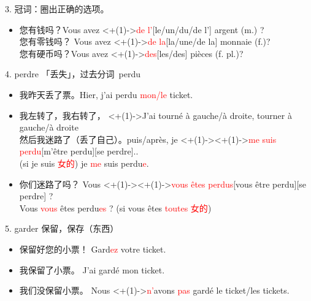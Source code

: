 \documentclass[french, aspectratio=169, 14pt, handout]{beamer}
\newcommand{\red}[1]{\textcolor{red}{#1}} %
\begin{document}
\begin{CJK*}{UTF8}{gkai}
\begin{frame}{3. 冠词：圈出正确的选项。}
\begin{itemize}
	\item 您有钱吗？Vous avez \alt<+(1)->{\red{de l'}}{[le/un/du/de l’]} argent (m.) ? \pause \\
	您有零钱吗？ Vous avez \alt<+(1)->{\red{de la}}{[la/une/de la]} monnaie (f.)? \pause \\
	您有硬币吗？Vous avez \alt<+(1)->{\red{des}}{[les/des]} pièces (f. pl.)?
\end{itemize}
\end{frame}

\begin{frame}{4. perdre 「丢失」，过去分词~perdu}
\begin{itemize}
	\item 我昨天丢了票。Hier, \pause j'ai perdu \pause \red{mon/le} ticket.  \pause
	\item 我左转了，我右转了， \pause \alt<+(1)->{J'ai tourné à gauche/à droite, }{tourner à gauche/à droite} \pause \\
	然后我迷路了（丢了自己）。puis/après, je \alt<+(1)->{\alt<+(1)->{\red{me suis perdu}}{[m'être perdu]}}{[se perdre].}.	\pause \\
	\hspace{155px} (si je suis \red{女的}) je \red{me} suis perdu\red{e}. \pause
	\item 你们迷路了吗？ Vous \alt<+(1)->{\alt<+(1)->{\red{vous êtes perdus}}{[vous être perdu]}}{[se perdre]} ? \pause \\
	\hspace{60px} Vous \red{vous} êtes perdu\red{es} ? (si vous êtes \red{toutes 女的})
\end{itemize}
\end{frame}

\begin{frame}{5. garder 保留，保存（东西）}
\begin{itemize}
	\item 保留好您的小票！ Gard\red{ez} votre ticket.  \pause
	\item 我保留了小票。 J'ai gardé mon ticket.  \pause
	\item 我们没保留小票。 Nous \only<+(1)->{\red{n'}}avons \red{pas} gardé le ticket/les tickets. 
\end{itemize}
\end{frame}


\end{CJK*}
\end{document}
